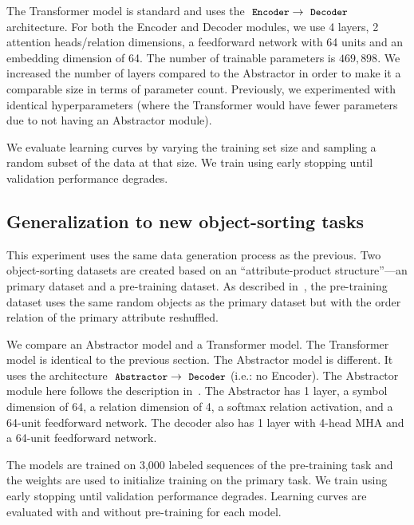The Transformer model is standard and uses the $\module{Encoder} \to \module{Decoder}$ architecture. For both the Encoder and Decoder modules, we use 4 layers, 2 attention heads/relation dimensions, a feedforward network with 64 units and an embedding dimension of 64. The number of trainable parameters is $469,898$. We increased the number of layers compared to the Abstractor in order to make it a comparable size in terms of parameter count. Previously, we experimented with identical hyperparameters (where the Transformer would have fewer parameters due to not having an Abstractor module).

We evaluate learning curves by varying the training set size and sampling a random subset of the data at that size. We train using early stopping until validation performance degrades.

\subsection{Generalization to new object-sorting tasks}\label{ssec:supp_exp_object_sorting_generalization}
This experiment uses the same data generation process as the previous. Two object-sorting datasets are created based on an ``attribute-product structure''---an primary dataset and a pre-training dataset. As described in~, the pre-training dataset uses the same random objects as the primary dataset but with the order relation of the primary attribute reshuffled.

We compare an Abstractor model and a Transformer model. The Transformer model is identical to the previous section. The Abstractor model is different. It uses the architecture $\module{Abstractor} \to \module{Decoder}$ (i.e.: no Encoder). The Abstractor module here follows the description in~. The Abstractor has 1 layer, a symbol dimension of 64, a relation dimension of 4, a softmax relation activation, and a 64-unit feedforward network. The decoder also has 1 layer with 4-head MHA and a 64-unit feedforward network.

The models are trained on 3,000 labeled sequences of the pre-training task and the weights are used to initialize training on the primary task. We train using early stopping until validation performance degrades. Learning curves are evaluated with and without pre-training for each model.

